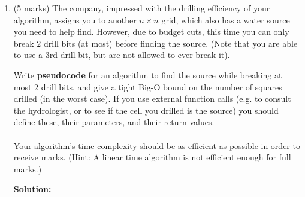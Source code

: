 \documentclass[a4,13pt]{extarticle}
\newenvironment{Solution}{\color{blue}\textbf{Solution:}}{}
\begin{document}
\begin{enumerate}
\begin{enumerate}
\begin{Solution}
				This algorithm drills $log(n)$ holes for the first helper and $log(n)$ holes for the second helper where $n$ is the height and width as defined in the question and also the length of the diagonal (since $\sqrt{n^2} = n$). This is because both sub-algorithms halve the potential search space on each of their recursive calls. Hence, the overall number of holes drilled can be said to be $2log(n) + a$ where $n$ is as defined in the question and $a$ is a constant representing any primitive operations called as initialisation and between the two helpers. As such, it can be said that this algorithm is $O(log(n))$.
	      	\end{Solution}
	      	      	      	              
	      	\item 
	      	      (5 marks) The company, impressed with the drilling efficiency of your algorithm, assigns you to another $n \times n$ grid, 
	      	      which also has a water source you need to help find. However, due to budget cuts, this time you can only break $2$ drill 
	      	      bits (at most) before finding the source. (Note that you are able to use a $3$rd drill bit, but are not allowed to ever break it).
	      	      	      	              
	      	      Write \textbf{pseudocode} for an algorithm to find the source while breaking at most $2$ drill bits, and give a tight Big-O 
	      	      bound on the number of squares drilled (in the worst case). If you use external function calls (e.g. to consult the hydrologist, 
	      	      or to see if the cell you drilled is the source) you should define these, their parameters, and their return values. \\\\
	      	      Your algorithm's time complexity should be as efficient as possible in order to receive marks. 
	      	      (Hint: A linear time algorithm is not efficient enough for full marks.)
	      	      
	      	\begin{Solution}
	      	\end{Solution}
	      	      	      	              
	      \end{enumerate}     	          
\end{enumerate}
\end{document}
